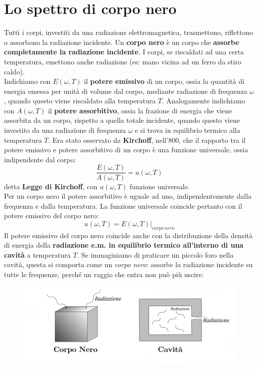 \section{Lo spettro di corpo nero}
Tutti i corpi, investiti da una radiazione elettromagnetica, trasmettono, riflettono o assorbono la radiazione incidente. Un \textbf{corpo nero} è un corpo che \textbf{assorbe completamente la radiazione incidente}. I corpi, se riscaldati ad una certa temperatura, emettono anche radiazione (es: mano vicina ad un ferro da stiro caldo).\\
Indichiamo con $E(\omega , T) $ il \textbf{potere emissivo} di un corpo, ossia la quantità di energia emessa per unità di volume dal corpo, mediante radiazione di frequenza $\omega$, quando questo viene riscaldato alla temperatura $T$. Analogamente indichiamo con $A(\omega , T )$ il \textbf{potere assorbitivo}, ossia la frazione di energia che viene assorbita da un corpo, rispetto a quella totale incidente, quando questo viene investito da una radiazione di frequenza $\omega$ e si trova in equilibrio termico alla temperatura $T$.
Era stato osservato da \textbf{Kirchoff}, nell'800, che il rapporto tra il potere emissivo e potere assorbitivo di un corpo è una funzione universale, ossia indipendente dal corpo:
\begin{equation}
\frac{E(\omega ,T)}{A(\omega ,T)}= u(\omega , T)
\end{equation}
detta \textbf{Legge di Kirchoff}, con $u(\omega , T)$ funzione universale.\\
Per un corpo nero il potere assorbitivo è uguale ad uno, indipendentemente dalla frequenza e dalla temperatura. La funzione universale coincide pertanto con il potere emissivo del corpo nero:
\begin{equation}
u(\omega, T)= E(\omega , T)|_{corpo\ nero}
\end{equation}
Il potere emissivo del corpo nero coincide anche con la distribuzione della densità di energia della \textbf{radiazione e.m. in equilibrio termico all'interno di una cavità} a temperatura $T$. Se immaginiamo di praticare un piccolo foro nella cavità, questa si comporta come un \textit{corpo nero}: assorbe la radiazione incidente su tutte le frequenze, perché un raggio che entra non può più uscire:
\begin{figure}[!htbp]
\includegraphics[width=\textwidth]{immagini/cap_1/fig_1_1.png}
\end{figure}\\
